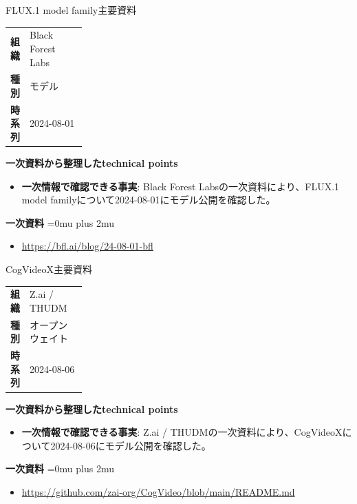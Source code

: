 \begin{technicalnote}{FLUX.1 model family}{主要資料}
\begingroup
\begin{tabularx}{\linewidth}{@{}>{\bfseries}p{0.22\linewidth}X@{}}
組織 & Black Forest Labs \\
種別 & モデル \\
時系列 & 2024-08-01 \\
\end{tabularx}
\smallskip
{\bfseries 一次資料から整理したtechnical points}
\begin{itemize}[leftmargin=1.5em,itemsep=0.35em]
\item \textbf{一次情報で確認できる事実}: Black Forest Labsの一次資料により、FLUX.1 model familyについて2024-08-01にモデル公開を確認した。
\end{itemize}
\begin{minipage}{\linewidth}
\begin{samepage}
{\bfseries 一次資料}
\begingroup\sloppy
\Urlmuskip=0mu plus 2mu\relax
\begin{itemize}[leftmargin=1.5em,itemsep=0.25em]
\item {\scriptsize\url{https://bfl.ai/blog/24-08-01-bfl}}
\end{itemize}
\endgroup
\end{samepage}
\end{minipage}
\endgroup
\end{technicalnote}
\medskip

\begin{technicalnote}{CogVideoX}{主要資料}
\begingroup
\begin{tabularx}{\linewidth}{@{}>{\bfseries}p{0.22\linewidth}X@{}}
組織 & Z.ai / THUDM \\
種別 & オープンウェイト \\
時系列 & 2024-08-06 \\
\end{tabularx}
\smallskip
{\bfseries 一次資料から整理したtechnical points}
\begin{itemize}[leftmargin=1.5em,itemsep=0.35em]
\item \textbf{一次情報で確認できる事実}: Z.ai / THUDMの一次資料により、CogVideoXについて2024-08-06にモデル公開を確認した。
\end{itemize}
\begin{minipage}{\linewidth}
\begin{samepage}
{\bfseries 一次資料}
\begingroup\sloppy
\Urlmuskip=0mu plus 2mu\relax
\begin{itemize}[leftmargin=1.5em,itemsep=0.25em]
\item {\scriptsize\url{https://github.com/zai-org/CogVideo/blob/main/README.md}}
\end{itemize}
\endgroup
\end{samepage}
\end{minipage}
\endgroup
\end{technicalnote}
\medskip

